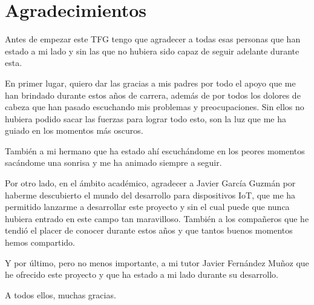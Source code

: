 \newpage %
\thispagestyle{empty}
\mbox{}

\chapter*{Agradecimientos}
\setcounter{page}{5}
Antes de empezar este TFG tengo que agradecer a todas esas personas que han estado a mi lado y sin las que no hubiera sido capaz de seguir adelante durante esta.

En primer lugar, quiero dar las gracias a mis padres por todo el apoyo que me han brindado durante estos años de carrera, además de por todos los dolores de cabeza que han pasado escuchando mis problemas y preocupaciones. Sin ellos no hubiera podido sacar las fuerzas para lograr todo esto, son la luz que me ha guiado en los momentos más oscuros.

También a mi hermano que ha estado ahí escuchándome en los peores momentos sacándome una sonrisa y me ha animado siempre a seguir.

Por otro lado, en el ámbito académico, agradecer a Javier García Guzmán por haberme descubierto el mundo del desarrollo para dispositivos IoT, que me ha permitido lanzarme a desarrollar este proyecto y sin el cual puede que nunca hubiera entrado en este campo tan maravilloso. También a los compañeros que he tendió el placer de conocer durante estos años y que tantos buenos momentos hemos compartido.

Y por último, pero no menos importante, a mi tutor Javier Fernández Muñoz que he ofrecido este proyecto y que ha estado a mi lado durante su desarrollo.

A todos ellos, muchas gracias.